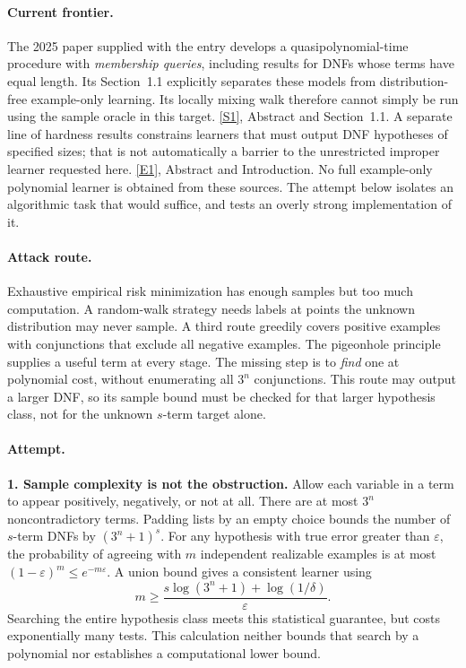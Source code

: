 \documentclass[11pt,a4paper]{article}
\newcommand{\eps}{\varepsilon}
\newcommand{\sref}[2]{\hyperlink{source:#1:#2}{[S#2]}}
\newcommand{\eref}[2]{\hyperlink{extra:#1:#2}{[E#2]}}
\numberwithin{equation}{section}
\begin{document}
\paragraph{Current frontier.}
The 2025 paper supplied with the entry develops a quasipolynomial-time
procedure with \emph{membership queries}, including results for DNFs whose
terms have equal length. Its Section~1.1 explicitly separates these models
from distribution-free example-only learning. Its locally mixing walk
therefore cannot simply be run using the sample oracle in this target.
\sref{219}{1}, Abstract and Section~1.1.
A separate line of hardness results constrains learners that must output
DNF hypotheses of specified sizes; that is not automatically a barrier to
the unrestricted improper learner requested here. \eref{219}{1}, Abstract
and Introduction. No full example-only polynomial learner is obtained from
these sources. The attempt below isolates an algorithmic task that would
suffice, and tests an overly strong implementation of it.

\paragraph{Attack route.}
Exhaustive empirical risk minimization has enough samples but too much
computation. A random-walk strategy needs labels at points the unknown
distribution may never sample. A third route greedily covers positive
examples with conjunctions that exclude all negative examples. The
pigeonhole principle supplies a useful term at every stage. The missing
step is to \emph{find} one at polynomial cost, without enumerating all
$3^n$ conjunctions. This route may output a larger DNF, so its sample
bound must be checked for that larger hypothesis class, not for the
unknown $s$-term target alone.

\paragraph{Attempt.}
\textbf{1. Sample complexity is not the obstruction.}
Allow each variable in a term to appear positively, negatively, or not at
all. There are at most $3^n$ noncontradictory terms. Padding lists by an
empty choice bounds the number of $s$-term DNFs by $(3^n+1)^s$.
For any hypothesis with true error greater than $\eps$, the probability
of agreeing with $m$ independent realizable examples is at most
$(1-\eps)^m\le e^{-m\eps}$. A union bound gives a consistent learner
using
\[
 m\ge\frac{s\log(3^n+1)+\log(1/\delta)}{\eps}.
\]
Searching the entire hypothesis class meets this statistical guarantee,
but costs exponentially many tests. This calculation neither bounds that
search by a polynomial nor establishes a computational lower bound.
\end{document}

